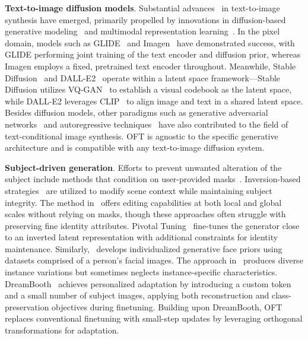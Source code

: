 \textbf{Text-to-image diffusion models}. Substantial advances~\cite{saharia2022photorealistic,ramesh2022hierarchical,rombach2022high,gu2022vector,nichol2022glide} in text-to-image synthesis have emerged, primarily propelled by innovations in diffusion-based generative modeling~\cite{ho2020denoising,song2021score,song2021denoising,dhariwal2021diffusion} and multimodal representation learning~\cite{su2020vlbert,lu2019vilbert,radford2021learning,wang2021simvlm,li2022blip,li2023blip,alayrac2022flamingo,schuhmann2022laion}. In the pixel domain, models such as GLIDE~\cite{nichol2022glide} and Imagen~\cite{saharia2022photorealistic} have demonstrated success, with GLIDE performing joint training of the text encoder and diffusion prior, whereas Imagen employs a fixed, pretrained text encoder throughout. Meanwhile, Stable Diffusion~\cite{rombach2022high} and DALL-E2~\cite{ramesh2022hierarchical} operate within a latent space framework—Stable Diffusion utilizes VQ-GAN~\cite{esser2021taming} to establish a visual codebook as the latent space, while DALL-E2 leverages CLIP~\cite{radford2021learning} to align image and text in a shared latent space. Besides diffusion models, other paradigms such as generative adversarial networks~\cite{reed2016generative,zhang2017stackgan,xu2018attngan,li2019controllable} and autoregressive techniques~\cite{ramesh2021zero,ding2021cogview,wu2022nuwa,yuscaling} have also contributed to the field of text-conditional image synthesis. OFT is agnostic to the specific generative architecture and is compatible with any text-to-image diffusion system.

\textbf{Subject-driven generation}. Efforts to prevent unwanted alteration of the subject include methods that condition on user-provided masks~\cite{avrahami2022blended,nichol2022glide}. Inversion-based strategies~\cite{choi2021ilvr,dhariwal2021diffusion,ramesh2022hierarchical,gal2022image} are utilized to modify scene context while maintaining subject integrity. The method in~\cite{hertz2022prompt} offers editing capabilities at both local and global scales without relying on masks, though these approaches often struggle with preserving fine identity attributes. Pivotal Tuning~\cite{roich2022pivotal} fine-tunes the generator close to an inverted latent representation with additional constraints for identity maintenance. Similarly,~\cite{nitzan2022mystyle} develops individualized generative face priors using datasets comprised of a person's facial images. The approach in~\cite{casanova2021instance} produces diverse instance variations but sometimes neglects instance-specific characteristics. DreamBooth~\cite{ruiz2023dreambooth} achieves personalized adaptation by introducing a custom token and a small number of subject images, applying both reconstruction and class-preservation objectives during finetuning. Building upon DreamBooth, OFT replaces conventional finetuning with small-step updates by leveraging orthogonal transformations for adaptation.

